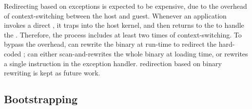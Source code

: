 Redirecting \linuxapis{} based on exceptions
is expected to be expensive,
due to the overhead of context-switching between the host and guest.
Whenever an application invokes a direct \linuxapi{},
it traps into the host kernel, and then returns to the \libos{} to handle the \linuxapi{}.
Therefore, the process includes at least two times of context-switching.
To bypass the overhead,
\thelibos{} can 
rewrite the binary at run-time to redirect the hard-coded \linuxapis{};
\thelibos{} can
either scan-and-rewrites the whole binary at loading time,
or rewrites a single  instruction in the exception handler.
\Linuxapi{} redirection based on binary rewriting is kept as future work.









\subsection{Bootstrapping}


\thelibos{}



